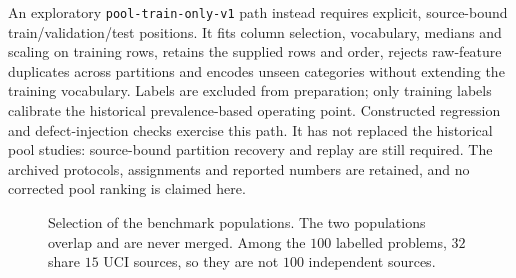 \documentclass[conference]{IEEEtran}
\begin{document}
An exploratory \texttt{pool-train-only-v1} path instead requires explicit,
source-bound train/validation/test positions. It fits column selection, vocabulary,
medians and scaling on training rows, retains the supplied rows and order,
rejects raw-feature duplicates across partitions and encodes unseen categories
without extending the training vocabulary. Labels are excluded from preparation;
only training labels calibrate the historical prevalence-based operating point.
Constructed regression and defect-injection checks exercise this path. It has
not replaced the historical pool studies: source-bound partition recovery and
replay are still required. The archived protocols, assignments and reported
numbers are retained, and no corrected pool ranking is claimed here.


\begin{figure}[t]
\centering
{}
\caption{Selection of the benchmark populations. The two populations overlap and are never merged. Among the
$100$ labelled problems, $32$ share $15$ UCI sources, so they are not $100$ independent sources.}
\label{fig:selection}
\end{figure}
\end{document}
